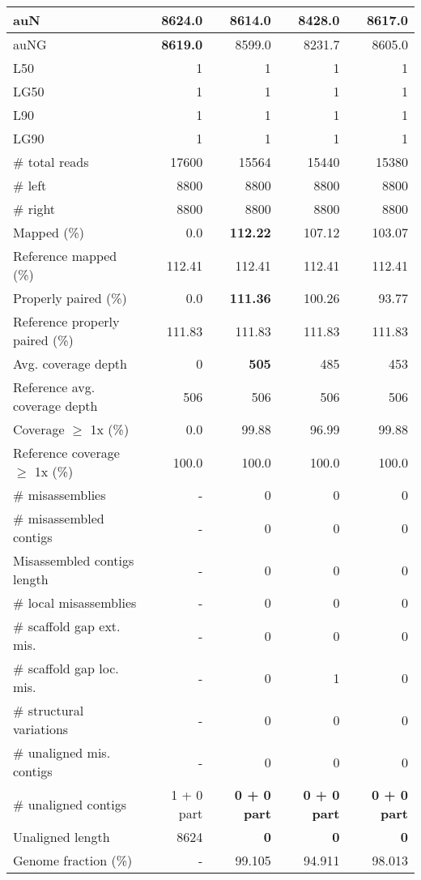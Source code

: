 \documentclass[12pt,a4paper]{article}
\begin{document}
\begin{table}[ht]
\begin{center}
\begin{tabular}{|l*{4}{|r}|}
auN & {\bf 8624.0} & 8614.0 & 8428.0 & 8617.0 \\ \hline
auNG & {\bf 8619.0} & 8599.0 & 8231.7 & 8605.0 \\ \hline
L50 & 1 & 1 & 1 & 1 \\ \hline
LG50 & 1 & 1 & 1 & 1 \\ \hline
L90 & 1 & 1 & 1 & 1 \\ \hline
LG90 & 1 & 1 & 1 & 1 \\ \hline
\# total reads & 17600 & 15564 & 15440 & 15380 \\ \hline
\# left & 8800 & 8800 & 8800 & 8800 \\ \hline
\# right & 8800 & 8800 & 8800 & 8800 \\ \hline
Mapped (\%) & 0.0 & {\bf 112.22} & 107.12 & 103.07 \\ \hline
Reference mapped (\%) & 112.41 & 112.41 & 112.41 & 112.41 \\ \hline
Properly paired (\%) & 0.0 & {\bf 111.36} & 100.26 & 93.77 \\ \hline
Reference properly paired (\%) & 111.83 & 111.83 & 111.83 & 111.83 \\ \hline
Avg. coverage depth & 0 & {\bf 505} & 485 & 453 \\ \hline
Reference avg. coverage depth & 506 & 506 & 506 & 506 \\ \hline
Coverage $\geq$ 1x (\%) & 0.0 & 99.88 & 96.99 & 99.88 \\ \hline
Reference coverage $\geq$ 1x (\%) & 100.0 & 100.0 & 100.0 & 100.0 \\ \hline
\# misassemblies & - & 0 & 0 & 0 \\ \hline
\# misassembled contigs & - & 0 & 0 & 0 \\ \hline
Misassembled contigs length & - & 0 & 0 & 0 \\ \hline
\# local misassemblies & - & 0 & 0 & 0 \\ \hline
\# scaffold gap ext. mis. & - & 0 & 0 & 0 \\ \hline
\# scaffold gap loc. mis. & - & 0 & 1 & 0 \\ \hline
\# structural variations & - & 0 & 0 & 0 \\ \hline
\# unaligned mis. contigs & - & 0 & 0 & 0 \\ \hline
\# unaligned contigs & 1 + 0 part & {\bf 0 + 0 part} & {\bf 0 + 0 part} & {\bf 0 + 0 part} \\ \hline
Unaligned length & 8624 & {\bf 0} & {\bf 0} & {\bf 0} \\ \hline
Genome fraction (\%) & - & 99.105 & 94.911 & 98.013 \\ \hline

\end{tabular}
\end{center}
\end{table}
\end{document}
